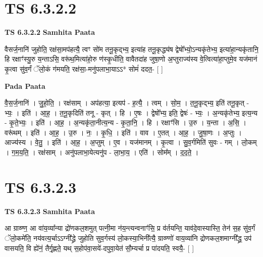 \documentclass[17pt]{extarticle}
\begin{document}

\section{ TS 6.3.2.2 }

\textbf{TS 6.3.2.2 } \newline
\textbf{Samhita Paata} \newline

वैसर्ज॒नानि॑ जुहोति॒ रक्ष॑सा॒मप॑हत्यै॒ त्वꣳ सो॑म तनू॒कृद्भ्य॒ इत्या॑ह तनू॒कृद्ध्य॑ष द्वेषो᳚भ्यो॒ऽन्यकृ॑तेभ्य॒ इत्या॑हा॒न्यकृ॑तानि॒ हि रक्षाꣳ॑स्यु॒रु य॒न्ताऽसि॒ वरू॑थ॒मित्या॑हो॒रु ण॑स्कृ॒धीति॒ वावैतदा॑ह जुषा॒णो अ॒प्तुराज्य॑स्य वे॒त्वित्या॑हा॒प्तुमे॒व यज॑मानं कृ॒त्वा सु॑व॒र्गं ॅलो॒कं ग॑मयति॒ रक्ष॑सा॒-मनु॑पलाभा॒याऽऽ* सोमं॑ ददत॒- [  ] \newline

\textbf{Pada Paata} \newline

वै॒स॒र्ज॒नानि॑ । जु॒हो॒ति॒ । रक्ष॑साम् । अप॑हत्या॒ इत्यप॑ - ह॒त्यै॒ । त्वम् । सो॒म॒ । त॒नू॒कृद्भ्य॒ इति॑ तनू॒कृत् - भ्यः॒ । इति॑ । आ॒ह॒ । त॒नू॒कृदिति॑ तनू - कृत् । हि । ए॒षः । द्वेषो᳚भ्य॒ इति॒ द्वेषः॑ - भ्यः॒ । अ॒न्यकृ॑तेभ्य॒ इत्य॒न्य - कृ॒ते॒भ्यः॒ । इति॑ । आ॒ह॒ । अ॒न्यकृ॑ता॒नीत्य॒न्य - कृ॒ता॒नि॒ । हि । रक्षाꣳ॑सि । उ॒रु । य॒न्ता । अ॒सि॒ । वरू॑थम् । इति॑ । आ॒ह॒ । उ॒रु । नः॒ । कृ॒धि॒ । इति॑ । वाव । ए॒तत् । आ॒ह॒ । जु॒षा॒णः । अ॒प्तुः । आज्य॑स्य । वे॒तु॒ । इति॑ । आ॒ह॒ । अ॒प्तुम् । ए॒व । यज॑मानम् । कृ॒त्वा । सु॒व॒र्गमिति॑ सुवः - गम् । लो॒कम् । ग॒म॒य॒ति॒ । रक्ष॑साम् । अनु॑पलाभा॒येत्यनु॑प - ला॒भा॒य॒ । एति॑ । सोम᳚म् । द॒द॒ते॒ ।  \newline





\section{ TS 6.3.2.3 }

\textbf{TS 6.3.2.3 } \newline
\textbf{Samhita Paata} \newline

आ ग्राव्ण्ण॒ आ वा॑य॒व्या᳚न्या द्रो॑णकल॒शमुत् पत्नी॒मा न॑य॒न्त्यन्वनाꣳ॑सि॒ प्र व॑र्तयन्ति॒ याव॑दे॒वास्यास्ति॒ तेन॑ स॒ह सु॑व॒र्गं ॅलो॒कमे॑ति॒ नय॑वत्य॒र्चाऽऽग्नी᳚द्ध्रे जुहोति सुव॒र्गस्य॑ लो॒कस्या॒भिनी᳚त्यै॒ ग्राव्ण्णो॑ वाय॒व्या॑नि द्रोणकल॒शमाग्नी᳚द्ध्र॒ उप॑ वासयति॒ वि ह्ये॑नं॒ तैर्गृ॒ह्णते॒ यथ् स॒होप॑वा॒सये॑-दपुवा॒येत॑ सौ॒म्यर्चा प्र पा॑दयति॒ स्वयै॒- [  ] \newline
\end{document}
